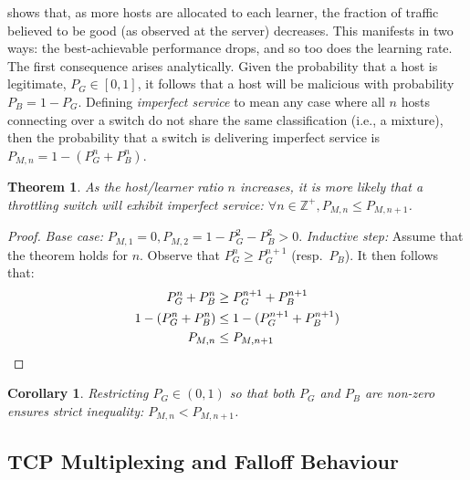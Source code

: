 \documentclass[conference, letterpaper, 10pt, times]{IEEEtran}
\newtheorem{thm}{Theorem}
\newtheorem{corr}{Corollary}[thm]
\begin{document}
 shows that, as more hosts are allocated to each learner, the fraction of traffic believed to be good (as observed at the server) decreases.
This manifests in two ways: the best-achievable performance drops, and so too does the learning rate.
The first consequence arises analytically.
Given the probability that a host is legitimate, $P_G \in [0,1]$, it follows that a host will be malicious with probability $P_B = 1 - P_G$.
Defining \emph{imperfect service} to mean any case where all $n$ hosts connecting over a switch do not share the same classification (i.e., a mixture), then the probability that a switch is delivering imperfect service is $P_{M,n} = 1 - (P_G^n + P_B^n)$.
\begin{thm}
	As the host/learner ratio $n$ increases, it is more likely that a throttling switch will exhibit imperfect service: $\forall n \in \mathbb{Z}^{+}, P_{M,n} \le P_{M,n+1}$.
\end{thm}
\begin{proof}
	\emph{Base case:} $P_{M,1}=0, P_{M,2} = 1 - P_G^2 - P_B^2 > 0$.
	\emph{Inductive step:} Assume that the theorem holds for $n$. Observe that $P_G^n \ge P_G^{n+1}$ (resp.\ $P_B$). It then follows that:
	\begin{align*}
	P_G^n + P_B^n &\ge P_G^{n+1} + P_B^{n+1}\\
	1 - (P_G^n + P_B^n) &\le 1 - (P_G^{n+1} + P_B^{n+1})\\
	P_{M,n} &\le P_{M,n+1} \qedhere
	\end{align*}
\end{proof}
\begin{corr}
	Restricting $P_G \in (0,1)$ so that both $P_G$ and $P_B$ are non-zero ensures strict inequality: $P_{M,n} < P_{M,n+1}$.
\end{corr}


\subsection{TCP Multiplexing and Falloff Behaviour}\label{sec:tcp-multiplexing-and-fallback-behaviour}

\end{document}
